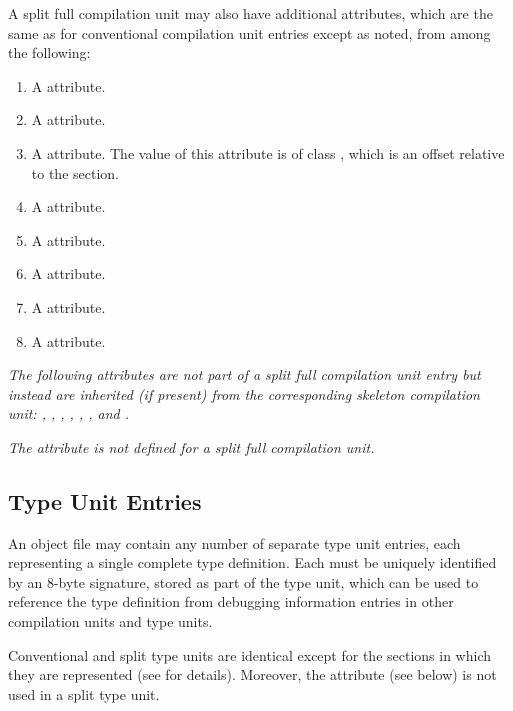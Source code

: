 A split full compilation unit may also have additional attributes, 
which are the same as for conventional compilation unit entries 
except as noted, from among the following:
\begin{enumerate}[1. ]
\addtocounter{enumi}{1}
\item A \DWATname{} attribute.
\item A \DWATlanguage{} attribute.
\item A \DWATmacros{} attribute.
The value of this attribute is of class \CLASSmacptr{}, which is 
an offset relative to the \dotdebugmacrodwo{} section.
        
\item A \DWATproducer{} attribute.        
\item A \DWATidentifiercase{} attribute.
\item A \DWATmainsubprogram{} attribute.
\item A \DWATentrypc{} attribute.
\item A \DWATuseUTFeight{} attribute.

\end{enumerate}

\textit{The following attributes are not part of a 
split full compilation unit entry but instead are inherited 
(if present) from the corresponding skeleton compilation unit: 
\DWATlowpc, \DWAThighpc, \DWATranges, \DWATstmtlist, \DWATcompdir, 
\DWATstroffsetsbase, \DWATaddrbase{} and 
\DWATrangesbase.}

\textit{The \DWATbasetypes{} attribute is not defined for a
split full compilation unit.}


\subsection{Type Unit Entries}
\label{chap:typeunitentries}
An object file may contain any number of separate type
unit entries, each representing a single complete type
definition. 
Each  must be uniquely identified by
an 8-byte signature, stored as part of the type unit, which
can be used to reference the type definition from debugging
information entries in other compilation units and type units.

Conventional and split type units are identical except for
the sections in which they are represented 
(see  for details).
Moreover, the \DWATstroffsetsbase{} attribute (see below) is not 
used in a split type unit.

